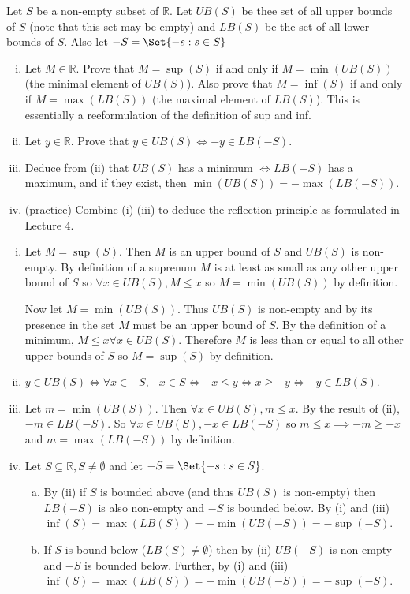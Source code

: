 \documentclass[paper=a4, fontsize=11pt]{jhwhw} %
\begin{document}
Let $S$ be a non-empty subset of $\mathbb R$. Let $UB(S)$ be thee set of all upper bounds of $S$ (note that this set may be empty) and $LB(S)$ be the set of all lower bounds of $S$. Also let $-S = \Set{-s:s\in S}$
\begin{enumerate}[(i)]
    \item Let $M\in \mathbb R$. Prove that $M = \sup(S)$ if and only if $M = \min(UB(S))$ (the minimal element of $UB(S)$). Also prove that $M = \inf(S)$ if and only if $M = \max(LB(S))$ (the maximal element of $LB(S)$). This is essentially a reeformulation of the definition of sup and inf.
    \item Let $y\in \mathbb R$. Prove that $y\in UB(S) \iff -y\in LB(-S)$.
    \item Deduce from (ii) that $UB(S)$ has a minimum $\iff LB(-S)$ has a maximum, and if they exist, then $\min(UB(S)) = -\max(LB(-S))$.
    \item (practice) Combine (i)-(iii) to deduce the reflection principle as formulated in Lecture 4.
\end{enumerate}
\solution
\begin{enumerate}[(i)]
    \item Let $M = \sup(S)$. Then $M$ is an upper bound of $S$ and $UB(S)$ is non-empty. By definition of a suprenum $M$ is at least as small as any other upper bound of $S$ so $\forall x \in UB(S), M \le x$ so $M = \min(UB(S))$ by definition.

        Now let $M = \min(UB(S))$. Thus $UB(S)$ is non-empty and by its presence in the set $M$ must be an upper bound of $S$. By the definition of a minimum, $M \le x \forall x\in UB(S)$. Therefore $M$ is less than or equal to all other upper bounds of $S$ so $M=\sup(S)$ by definition.

    \item $y\in UB(S) \iff \forall x\in -S, -x\in S \iff -x \le y \iff x \ge -y \iff -y\in LB(S)$.

    \item Let $m = \min(UB(S))$. Then $\forall x \in UB(S), m \le x$. By the result of (ii), $-m\in LB(-S)$. So $\forall x\in UB(S), -x \in LB(-S)$ so $m\le x \implies -m \ge -x$ and $m = \max(LB(-S))$ by definition.

    \item Let $S\subseteq \mathbb R, S\not=\emptyset$ and let $-S = \Set{-s:s\in S}$. 
        \begin{enumerate}[(a)]
            \item By (ii) if $S$ is bounded above (and thus $UB(S)$ is non-empty) then $LB(-S)$ is also non-empty and $-S$ is bounded below. By (i) and (iii) $\inf(S) = \max(LB(S)) = -\min(UB(-S)) = -\sup(-S)$.
            \item If $S$ is bound below ($LB(S) \not= \emptyset$) then by (ii) $UB(-S)$ is non-empty and $-S$ is bounded below. Further, by (i) and (iii) $\inf(S) = \max(LB(S)) = -\min(UB(-S)) = -\sup(-S)$.
        \end{enumerate}
\end{enumerate}
\end{document}
